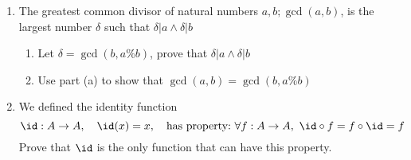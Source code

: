 \documentclass[basic, header]{nosvagor-notes}
\begin{document}
\begin{enumerate}[itemsep=4em]
    \item The greatest common divisor of natural numbers \(a, b; \gcd(a,b) \),
      is the largest number \(\delta\) such that \(\delta|a \land \delta|b\)
      \begin{enumerate}

        \item Let \(\delta = \gcd(b, a\%b)\), prove that \(\delta|a \land
          \delta|b\)

        \item Use part (a) to show that \(\gcd(a,b) = \gcd(b, a\%b)\)

      \end{enumerate}

  \newpage %

    \item We defined the identity function
      \[%
       \id : A \to A, \quad \id(x) = x, \quad  \text{has property:}~\forall f :
       A\to A,~ \id \circ f = f \circ \id = f
      \]%
      Prove that \(\id\) is the only function that can have this property.

\end{enumerate}
\end{document}
